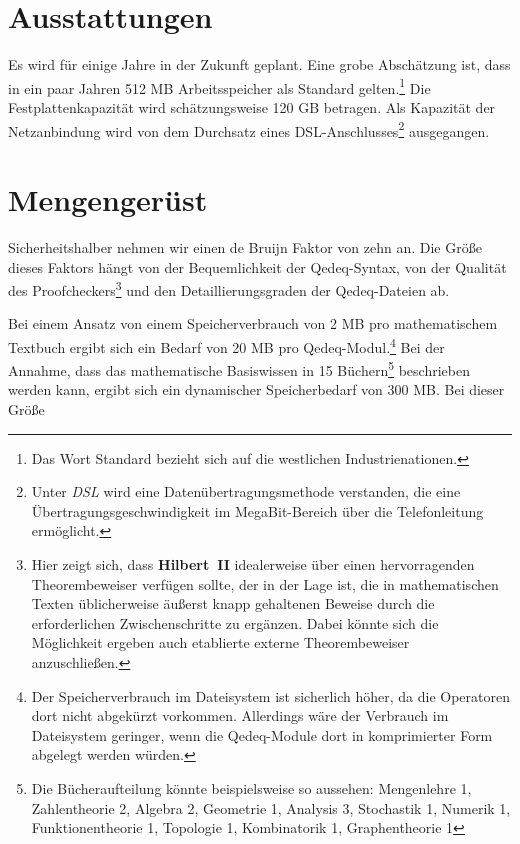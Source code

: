 \documentclass[a4paper,german,10pt,twoside]{book}
\begin{document}
{\section{Ausstattungen}
Es wird f{\"u}r {\glqq einige Jahre in der Zukunft\grqq} geplant. Eine grobe Absch{\"a}tzung ist, dass in
ein paar Jahren 512 MB Arbeitsspeicher als Standard gelten.\footnote{Das Wort {\glqq Standard\grqq}
bezieht sich auf die westlichen Industrienationen.} Die Festplattenkapazit{\"a}t wird sch{\"a}tzungsweise
120 GB betragen. Als Kapazit{\"a}t der Netzanbindung wird von dem Durchsatz eines
DSL-Anschlusses\footnote{Unter \emph{DSL} wird eine Daten{\"u}bertragungsmethode verstanden,
die eine {\"U}ber\-tragungs\-geschwindig\-keit im MegaBit-Bereich {\"u}ber die Telefonleitung erm{\"o}glicht.}
ausgegangen.

\section{Mengenger{\"u}st}
Sicherheitshalber nehmen wir einen de Bruijn Faktor von
zehn an. Die Gr{\"o}{\ss}e dieses Faktors h{\"a}ngt von der Bequemlichkeit der Qedeq-Syntax, von der Qualit{\"a}t
des Proofcheckers\footnote{Hier zeigt sich, dass \textbf{Hilbert~II}
idealerweise {\"u}ber einen hervorragenden Theorembeweiser verf{\"u}gen sollte, der
in der Lage ist, die in mathematischen Texten {\"u}blicherweise {\"a}u{\ss}erst knapp gehaltenen Beweise durch
die erforderlichen Zwischenschritte zu erg{\"a}nzen. Dabei k{\"o}nnte sich die
M{\"o}glichkeit ergeben auch etablierte externe Theorembeweiser anzuschlie{\ss}en.} und den
Detaillierungsgraden der Qedeq-Dateien ab.
\par
Bei einem Ansatz von einem Speicherverbrauch von 2 MB pro mathematischem Textbuch ergibt sich ein
Bedarf von 20 MB pro Qedeq-Modul.\footnote{Der Speicherverbrauch im Dateisystem ist sicherlich
h{\"o}her, da die Operatoren dort nicht abgek{\"u}rzt vorkommen. Allerdings w{\"a}re der Verbrauch im
Dateisystem geringer, wenn die Qedeq-Module dort in komprimierter Form abgelegt werden w{\"u}rden.} Bei
der Annahme, dass das mathematische Basiswissen in 15 B{\"u}chern\footnote{Die B{\"u}cheraufteilung k{\"o}nnte
beispielsweise so aussehen: Mengenlehre 1, Zahlentheorie 2, Algebra 2, Geometrie 1, Analysis 3,
Stochastik 1, Numerik 1, Funktionentheorie 1, Topologie 1, Kombinatorik 1, Graphentheorie 1}
beschrieben werden kann, ergibt sich ein dynamischer Speicherbedarf von 300 MB. Bei dieser Gr{\"o}{\ss}e
}
\end{document}

